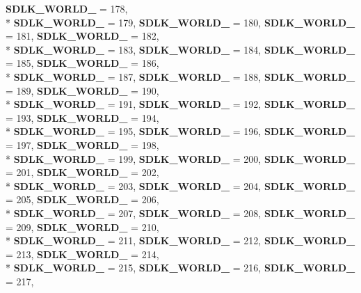 \begin{DoxyCompactItemize}
{\bf S\+D\+L\+K\+\_\+\+W\+O\+R\+L\+D\+\_} = 178, 
\\*
{\bf S\+D\+L\+K\+\_\+\+W\+O\+R\+L\+D\+\_} = 179, 
{\bf S\+D\+L\+K\+\_\+\+W\+O\+R\+L\+D\+\_} = 180, 
{\bf S\+D\+L\+K\+\_\+\+W\+O\+R\+L\+D\+\_} = 181, 
{\bf S\+D\+L\+K\+\_\+\+W\+O\+R\+L\+D\+\_} = 182, 
\\*
{\bf S\+D\+L\+K\+\_\+\+W\+O\+R\+L\+D\+\_} = 183, 
{\bf S\+D\+L\+K\+\_\+\+W\+O\+R\+L\+D\+\_} = 184, 
{\bf S\+D\+L\+K\+\_\+\+W\+O\+R\+L\+D\+\_} = 185, 
{\bf S\+D\+L\+K\+\_\+\+W\+O\+R\+L\+D\+\_} = 186, 
\\*
{\bf S\+D\+L\+K\+\_\+\+W\+O\+R\+L\+D\+\_} = 187, 
{\bf S\+D\+L\+K\+\_\+\+W\+O\+R\+L\+D\+\_} = 188, 
{\bf S\+D\+L\+K\+\_\+\+W\+O\+R\+L\+D\+\_} = 189, 
{\bf S\+D\+L\+K\+\_\+\+W\+O\+R\+L\+D\+\_} = 190, 
\\*
{\bf S\+D\+L\+K\+\_\+\+W\+O\+R\+L\+D\+\_} = 191, 
{\bf S\+D\+L\+K\+\_\+\+W\+O\+R\+L\+D\+\_} = 192, 
{\bf S\+D\+L\+K\+\_\+\+W\+O\+R\+L\+D\+\_} = 193, 
{\bf S\+D\+L\+K\+\_\+\+W\+O\+R\+L\+D\+\_} = 194, 
\\*
{\bf S\+D\+L\+K\+\_\+\+W\+O\+R\+L\+D\+\_} = 195, 
{\bf S\+D\+L\+K\+\_\+\+W\+O\+R\+L\+D\+\_} = 196, 
{\bf S\+D\+L\+K\+\_\+\+W\+O\+R\+L\+D\+\_} = 197, 
{\bf S\+D\+L\+K\+\_\+\+W\+O\+R\+L\+D\+\_} = 198, 
\\*
{\bf S\+D\+L\+K\+\_\+\+W\+O\+R\+L\+D\+\_} = 199, 
{\bf S\+D\+L\+K\+\_\+\+W\+O\+R\+L\+D\+\_} = 200, 
{\bf S\+D\+L\+K\+\_\+\+W\+O\+R\+L\+D\+\_} = 201, 
{\bf S\+D\+L\+K\+\_\+\+W\+O\+R\+L\+D\+\_} = 202, 
\\*
{\bf S\+D\+L\+K\+\_\+\+W\+O\+R\+L\+D\+\_} = 203, 
{\bf S\+D\+L\+K\+\_\+\+W\+O\+R\+L\+D\+\_} = 204, 
{\bf S\+D\+L\+K\+\_\+\+W\+O\+R\+L\+D\+\_} = 205, 
{\bf S\+D\+L\+K\+\_\+\+W\+O\+R\+L\+D\+\_} = 206, 
\\*
{\bf S\+D\+L\+K\+\_\+\+W\+O\+R\+L\+D\+\_} = 207, 
{\bf S\+D\+L\+K\+\_\+\+W\+O\+R\+L\+D\+\_} = 208, 
{\bf S\+D\+L\+K\+\_\+\+W\+O\+R\+L\+D\+\_} = 209, 
{\bf S\+D\+L\+K\+\_\+\+W\+O\+R\+L\+D\+\_} = 210, 
\\*
{\bf S\+D\+L\+K\+\_\+\+W\+O\+R\+L\+D\+\_} = 211, 
{\bf S\+D\+L\+K\+\_\+\+W\+O\+R\+L\+D\+\_} = 212, 
{\bf S\+D\+L\+K\+\_\+\+W\+O\+R\+L\+D\+\_} = 213, 
{\bf S\+D\+L\+K\+\_\+\+W\+O\+R\+L\+D\+\_} = 214, 
\\*
{\bf S\+D\+L\+K\+\_\+\+W\+O\+R\+L\+D\+\_} = 215, 
{\bf S\+D\+L\+K\+\_\+\+W\+O\+R\+L\+D\+\_} = 216, 
{\bf S\+D\+L\+K\+\_\+\+W\+O\+R\+L\+D\+\_} = 217, 

\end{DoxyCompactItemize}
